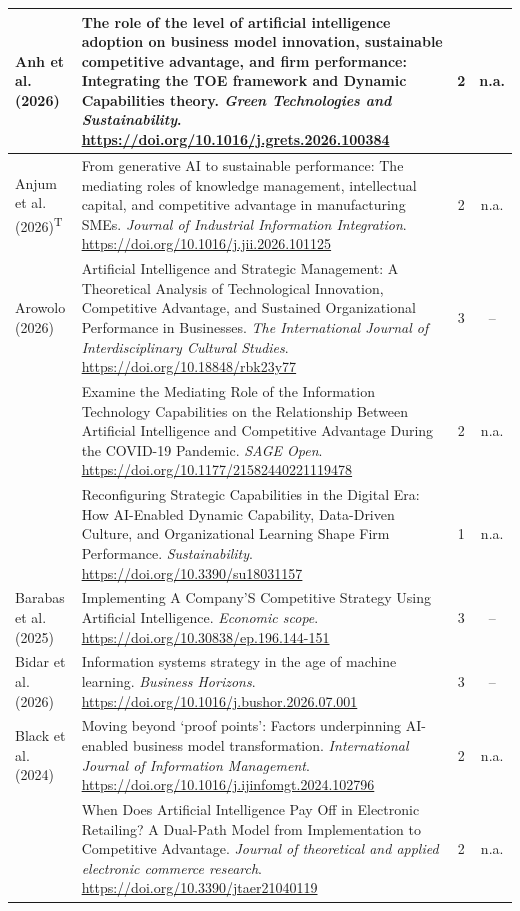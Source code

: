 {\begin{longtable}{|>{\raggedright\arraybackslash}p{2.6cm}|>{\raggedright\arraybackslash}p{10.2cm}|c|c|}
Anh et al. (2026) & The role of the level of artificial intelligence adoption on business model innovation, sustainable competitive advantage, and firm performance: Integrating the TOE framework and Dynamic Capabilities theory. \textit{Green Technologies and Sustainability}. \url{https://doi.org/10.1016/j.grets.2026.100384} & 2 & n.a. \\ \hline
Anjum et al. (2026)\textsuperscript{T} & From generative AI to sustainable performance: The mediating roles of knowledge management, intellectual capital, and competitive advantage in manufacturing SMEs. \textit{Journal of Industrial Information Integration}. \url{https://doi.org/10.1016/j.jii.2026.101125} & 2 & n.a. \\ \hline
Arowolo (2026) & Artificial Intelligence and Strategic Management: A Theoretical Analysis of Technological Innovation, Competitive Advantage, and Sustained Organizational Performance in Businesses. \textit{The International Journal of Interdisciplinary Cultural Studies}. \url{https://doi.org/10.18848/rbk23y77} & 3 & -- \\ \hline
\textcite{awamleh2022} & Examine the Mediating Role of the Information Technology Capabilities on the Relationship Between Artificial Intelligence and Competitive Advantage During the COVID-19 Pandemic. \textit{SAGE Open}. \url{https://doi.org/10.1177/21582440221119478} & 2 & n.a. \\ \hline
\textcite{ayoub2026} & Reconfiguring Strategic Capabilities in the Digital Era: How AI-Enabled Dynamic Capability, Data-Driven Culture, and Organizational Learning Shape Firm Performance. \textit{Sustainability}. \url{https://doi.org/10.3390/su18031157} & 1 & n.a. \\ \hline
Barabas et al. (2025) & Implementing A Company'S Competitive Strategy Using Artificial Intelligence. \textit{Economic scope}. \url{https://doi.org/10.30838/ep.196.144-151} & 3 & -- \\ \hline
Bidar et al. (2026) & Information systems strategy in the age of machine learning. \textit{Business Horizons}. \url{https://doi.org/10.1016/j.bushor.2026.07.001} & 3 & -- \\ \hline
Black et al. (2024) & Moving beyond ‘proof points’: Factors underpinning AI-enabled business model transformation. \textit{International Journal of Information Management}. \url{https://doi.org/10.1016/j.ijinfomgt.2024.102796} & 2 & n.a. \\ \hline
\textcite{bunea2026} & When Does Artificial Intelligence Pay Off in Electronic Retailing? A Dual-Path Model from Implementation to Competitive Advantage. \textit{Journal of theoretical and applied electronic commerce research}. \url{https://doi.org/10.3390/jtaer21040119} & 2 & n.a. \\ \hline

\end{longtable}}
